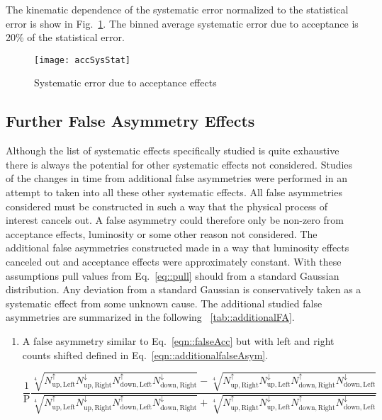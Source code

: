 \noindent
The kinematic dependence of the systematic error normalized to the statistical
error is show in Fig.~\ref{fig::accSysStat}.  The binned average systematic
error due to acceptance is 20\% of the statistical error.

\begin{figure}[h!t]
  \begin{center}
    \texttt{[image: accSysStat]}
    \caption{Systematic error due to acceptance effects}
    \label{fig::accSysStat}
  \end{center}
\end{figure}

\subsection{Further False Asymmetry Effects}
Although the list of systematic effects specifically studied is quite exhaustive
there is always the potential for other systematic effects not considered.
Studies of the changes in time from additional false asymmetries were performed
in an attempt to taken into all these other systematic effects.  All false
asymmetries considered must be constructed in such a way that the physical
process of interest cancels out.  A false asymmetry could therefore only be
non-zero from acceptance effects, luminosity or some other reason not
considered.  The additional false asymmetries constructed made in a way that
luminosity effects canceled out and acceptance effects were approximately
constant.  With these assumptions pull values from Eq.~\ref{eq::pull} should
from a standard Gaussian distribution.  Any deviation from a standard Gaussian
is conservatively taken as a systematic effect from some unknown cause.  The
additional studied false asymmetries are summarized in the following
~\ref{tab::additionalFA}.

\begin{enumerate}
  \label{tab::additionalFA}
\item A false asymmetry similar to Eq.~\ref{eqn::falseAcc} but with left and
  right counts shifted defined in Eq.~\ref{eqn::additionalfalseAsym}.
  
  \begin{equation}
    \label{eqn::additionalfalseAsym}
    \frac{1}{\mathrm{P}}
    \frac{
      \sqrt[4]{
        N_{\mathrm{up,Left}}^{\uparrow}N_{\mathrm{up,Right}}^{\downarrow}
        N_{\mathrm{down,Left}}^{\uparrow}N_{\mathrm{down,Right}}^{\downarrow}
      } -
      \sqrt[4]{
        N_{\mathrm{up,Right}}^{\uparrow}N_{\mathrm{up,Left}}^{\downarrow}
        N_{\mathrm{down,Right}}^{\uparrow}N_{\mathrm{down, Left}}^{\downarrow}
      }
    }{
      \sqrt[4]{
        N_{\mathrm{up,Left}}^{\uparrow}N_{\mathrm{up,Right}}^{\downarrow}
        N_{\mathrm{down,Left}}^{\uparrow}N_{\mathrm{down, Right}}^{\downarrow}
      } +
      \sqrt[4]{
        N_{\mathrm{up,Right}}^{\uparrow}N_{\mathrm{up,Left}}^{\downarrow}
        N_{\mathrm{down,Right}}^{\uparrow}N_{\mathrm{down, Left}}^{\downarrow}
      }
    }
  \end{equation}
\end{enumerate}

